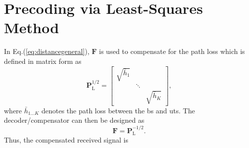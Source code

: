 \documentclass[12pt,draftclsnofoot,onecolumn,journal]{IEEEtran}
\begin{document}
\section{Precoding via Least-Squares Method}
In Eq.(\ref{eq:distancegeneral}), $\mathbf F$ is used to compensate for the path loss which is defined in matrix form as
\begin{equation}
\mathbf P_{\mathrm L}^{1/2}=
\begin{bmatrix}
\sqrt{\bar h_1} & & \\
&\ddots & \\
& &\sqrt{\bar h_K}
\end{bmatrix},
\end{equation}
where $\bar h_{1\dots K}$ denotes the path loss between the \ac{bs} and \acp{ut}.
The decoder/compensator can then be designed as 
\begin{equation}
\mathbf F=\mathbf P_{\mathrm L}^{-1/2}.
\end{equation}
Thus, the compensated received signal is
\end{document}
